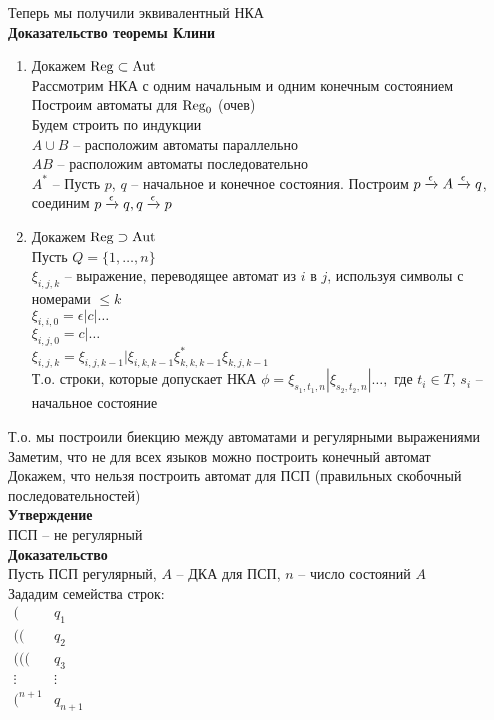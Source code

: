 \documentclass[12pt]{article}
\begin{document}
Теперь мы получили эквивалентный НКА\\
\textbf{Доказательство теоремы Клини}
\begin{enumerate}
    \item Докажем $\operatorname{Reg} \subset \operatorname{Aut}$\\
    Рассмотрим НКА с одним начальным и одним конечным состоянием\\
    Построим автоматы для $\operatorname{Reg}_0$ (очев)\\
    Будем строить по индукции\\
    $A \cup B$ -- расположим автоматы параллельно\\
    $AB$ -- расположим автоматы последовательно\\
    $A^*$ -- Пусть $p$, $q$ -- начальное и конечное состояния. Построим $p \xrightarrow{\epsilon} A \xrightarrow{\epsilon} q$, соединим $p \xrightarrow{\epsilon} q, q \xrightarrow{\epsilon} p$
    \item Докажем $\operatorname{Reg} \supset \operatorname{Aut}$\\
    Пусть $Q = \{1,\ldots, n\}$\\
    $\xi_{i,j,k}$ -- выражение, переводящее автомат из $i$ в $j$, используя символы с номерами $\leq k$\\
    $\xi_{i,i,0} = \epsilon|c|\ldots$\\
    $\xi_{i,j,0} = c|\ldots$\\
    $\xi_{i,j,k} = \xi_{i,j,k-1} | \xi_{i,k,k-1}\xi^*_{k,k,k-1}\xi_{k,j,k-1}$\\
    Т.о. строки, которые допускает НКА $\phi = \xi_{s_1,t_1,n}|\xi_{s_2,t_2,n}|\ldots,$ где $t_i\in T$, $s_i$ -- начальное состояние
\end{enumerate}
Т.о. мы построили биекцию между автоматами и регулярными выражениями\\
Заметим, что не для всех языков можно построить конечный автомат\\
Докажем, что нельзя построить автомат для ПСП (правильных скобочный последовательностей)\\
\textbf{Утверждение}\\
ПСП -- не регулярный\\
\textbf{Доказательство}\\
Пусть ПСП регулярный, $A$ -- ДКА для ПСП, $n$ -- число состояний $A$\\
Зададим семейства строк:\\
$\begin{array}{cc}
    ( & q_1\\
    (( & q_2\\
    ((( & q_3\\
    \vdots & \vdots\\
    (^{n+1} & q_{n+1}\\
\end{array}$\\
\end{document}
